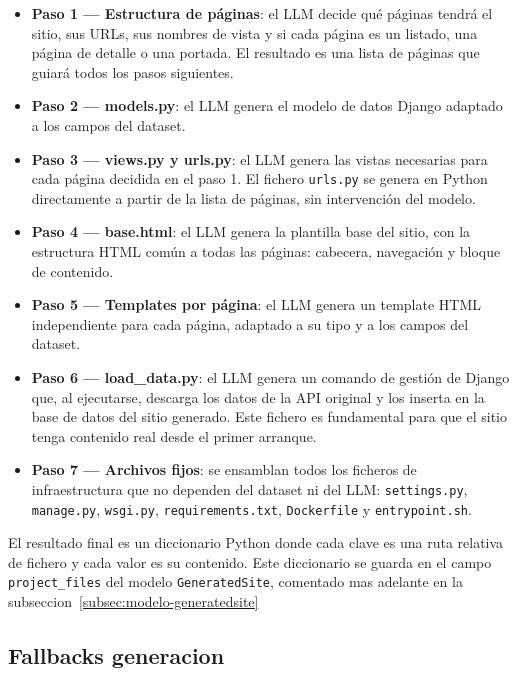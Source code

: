 \begin{itemize}
    \item \textbf{Paso 1 — Estructura de páginas}: el LLM decide qué páginas tendrá el sitio, sus URLs, sus nombres de vista y si cada página es un listado, una página de detalle o una portada. El resultado es una lista de páginas que guiará todos los pasos siguientes.
    \item \textbf{Paso 2 — models.py}: el LLM genera el modelo de datos Django adaptado a los campos del dataset.    
    \item \textbf{Paso 3 — views.py y urls.py}: el LLM genera las vistas necesarias para cada página decidida en el paso 1. El fichero \texttt{urls.py} se genera en Python directamente a partir de la lista de páginas, sin intervención del modelo.
    
    \item \textbf{Paso 4 — base.html}: el LLM genera la plantilla base del sitio, con la estructura HTML común a todas las páginas: cabecera, navegación y bloque de contenido.
    
    \item \textbf{Paso 5 — Templates por página}: el LLM genera un template HTML independiente para cada página, adaptado a su tipo y a los campos del dataset.
    
    \item \textbf{Paso 6 — load\_data.py}: el LLM genera un comando de gestión de Django que, al ejecutarse, descarga los datos de la API original y los inserta en la base de datos del sitio generado. Este fichero es fundamental para que el sitio tenga contenido real desde el primer arranque.
    
    \item \textbf{Paso 7 — Archivos fijos}: se ensamblan todos los ficheros de infraestructura que no dependen del dataset ni del LLM: \texttt{settings.py}, \texttt{manage.py}, \texttt{wsgi.py}, \texttt{requirements.txt}, \texttt{Dockerfile} y \texttt{entrypoint.sh}.
\end{itemize}

El resultado final es un diccionario Python donde cada clave es una ruta relativa de fichero y cada valor es su contenido. Este diccionario se guarda en el campo \texttt{project\_files} del modelo \texttt{GeneratedSite}, comentado mas adelante en la subseccion~\ref{subsec:modelo-generatedsite}



\subsection{Fallbacks generacion}
\label{subsec:fallbacks-generacion}


